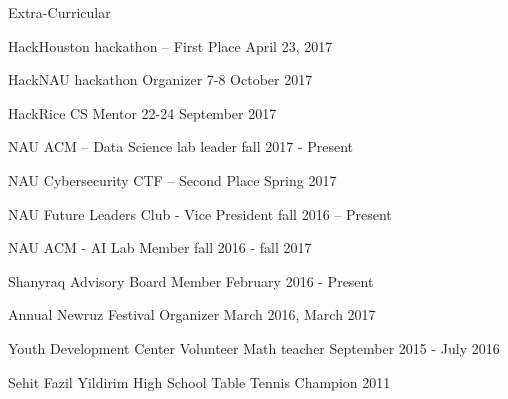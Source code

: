 \documentclass[10pt]{resume} %
\begin{document}
\begin{rSection}{Extra-Curricular} \itemsep -3pt
\item HackHouston hackathon – First Place \hfill April 23, 2017

\item  HackNAU hackathon Organizer \hfill 7-8 October 2017

\item  HackRice CS Mentor  \hfill 22-24 September 2017

\item  NAU ACM – Data Science lab leader \hfill fall 2017 - Present

\item NAU Cybersecurity CTF – Second Place \hfill Spring 2017 

\item NAU Future Leaders Club - Vice President \hfill fall 2016 – Present

\item NAU ACM - AI Lab Member \hfill fall 2016 - fall 2017

\item Shanyraq Advisory Board Member \hfill February 2016 - Present

\item Annual Newruz Festival Organizer \hfill March 2016, March 2017

\item Youth Development Center Volunteer Math teacher \hfill September 2015 - July 2016

\item Sehit Fazil Yildirim High School Table Tennis Champion  \hfill 2011





\end{rSection}
\end{document}
